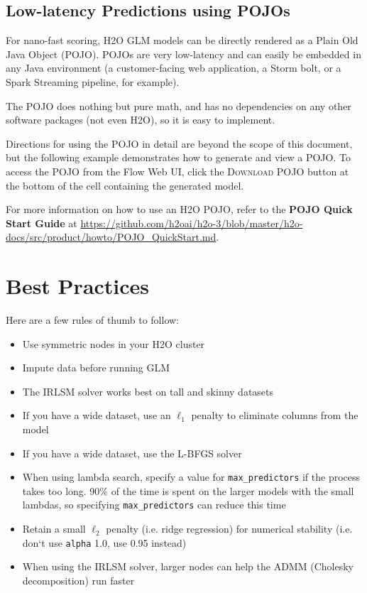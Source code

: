 \subsection{Low-latency Predictions using POJOs}

For nano-fast scoring, H2O GLM models can be directly rendered as a Plain Old Java Object (POJO).  POJOs are very
low-latency and can easily be embedded in any Java environment (a customer-facing web application, a Storm bolt,
or a Spark Streaming pipeline, for example).

The POJO does nothing but pure math, and has no dependencies on any other software packages (not even H2O),
so it is easy to implement.

Directions for using the POJO in detail are beyond the scope of this document, but the following example demonstrates how to generate and view a POJO.  To access the POJO from the Flow Web UI, click the \textsc{Download POJO} button at the bottom of the cell containing the generated model.

For more information on how to use an H2O POJO, refer to the \textbf{POJO Quick Start Guide} at {\url{https://github.com/h2oai/h2o-3/blob/master/h2o-docs/src/product/howto/POJO_QuickStart.md}}. 

\waterExampleInR

\newpage
\waterExampleInPython



\section{Best Practices}

Here are a few rules of thumb to follow:

\begin{itemize}
\item Use symmetric nodes in your H2O cluster
\item Impute data before running GLM
\item The IRLSM solver works best on tall and skinny datasets
\item If you have a wide dataset, use an  $\ell_1$ penalty to eliminate columns from the model
\item If you have a wide dataset, use the L-BFGS solver
\item When using lambda search, specify a value for \texttt{max\_predictors} if the process takes too long. 90\% of the time is spent on the larger models with the small lambdas, so specifying \texttt{max\_predictors} can reduce this time
\item Retain a small  $\ell_2$ penalty (i.e. ridge regression) for numerical stability (i.e. don`t use \texttt{alpha} 1.0, use 0.95 instead)
\item When using the IRLSM solver, larger nodes can help the ADMM (Cholesky decomposition) run faster
\end{itemize}

